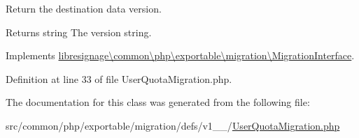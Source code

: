 Return the destination data version.

\begin{DoxyReturn}{Returns}
string The version string. 
\end{DoxyReturn}


Implements \hyperlink{interfacelibresignage_1_1common_1_1php_1_1exportable_1_1migration_1_1MigrationInterface_a9eddabf63771d4d1081bd6d067c7dff5}{libresignage\textbackslash{}common\textbackslash{}php\textbackslash{}exportable\textbackslash{}migration\textbackslash{}\+Migration\+Interface}.



Definition at line 33 of file User\+Quota\+Migration.\+php.



The documentation for this class was generated from the following file\+:\begin{DoxyCompactItemize}
\item 
src/common/php/exportable/migration/defs/v1\+\_\+\_/\hyperlink{v1__0__0_2UserQuotaMigration_8php}{User\+Quota\+Migration.\+php}\end{DoxyCompactItemize}
